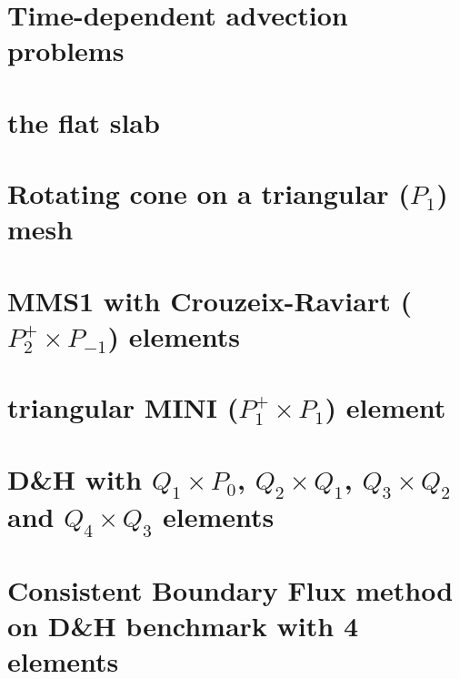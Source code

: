 \documentclass[a4paper,11pt]{report}
\begin{document}
\chapter{Time-dependent advection problems\label{f43}} %

\chapter{the flat slab \label{f44}} %

\chapter{Rotating cone on a triangular ($P_1$) mesh\label{f45}} %

\chapter{MMS1 with Crouzeix-Raviart ($P_2^+\times P_{-1}$) elements  \label{f46}} %

\chapter{triangular MINI ($P_1^+\times P_1$) element \label{f47}} %

\chapter{D\&H with $Q_1\times P_0$, $Q_2\times Q_1$, $Q_3\times Q_2$ and $Q_4\times Q_3$ elements \label{f48}} 

\chapter{Consistent Boundary Flux method on D\&H benchmark with 4 elements \label{f49}} %
\end{document}
